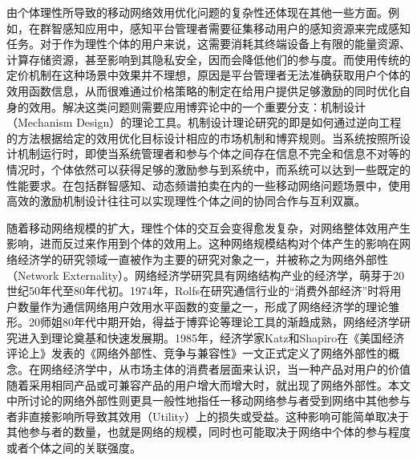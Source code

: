 由个体理性所导致的移动网络效用优化问题的复杂性还体现在其他一些方面。例如，在群智感知应用中，感知平台管理者需要征集移动用户的感知资源来完成感知任务。对于作为理性个体的用户来说，这需要消耗其终端设备上有限的能量资源、计算存储资源，甚至影响到其隐私安全，因而会降低他们的参与度。而使用传统的定价机制在这种场景中效果并不理想，原因是平台管理者无法准确获取用户个体的效用函数信息，从而很难通过价格策略的制定在给用户提供足够激励的同时优化自身的效用。解决这类问题则需要应用博弈论中的一个重要分支：机制设计（Mechanism Design）的理论工具\cite{Nisan07}。机制设计理论研究的即是如何通过逆向工程的方法根据给定的效用优化目标设计相应的市场机制和博弈规则。当系统按照所设计机制运行时，即使当系统管理者和参与个体之间存在信息不完全和信息不对等的情况时，个体依然可以获得足够的激励参与到系统中，而系统可以达到一些既定的性能要求。在包括群智感知、动态频谱拍卖在内的一些移动网络问题场景中，使用高效的激励机制设计往往可以实现理性个体之间的协同合作与互利双赢。




随着移动网络规模的扩大，理性个体的交互会变得愈发复杂，对网络整体效用产生影响，进而反过来作用到个体的效用上。这种网络规模结构对个体产生的影响在网络经济学的研究领域一直被作为主要的研究对象之一，并被称之为网络外部性（Network Externality）。网络经济学研究具有网络结构产业的经济学，萌芽于20世纪50年代至80年代初。1974年，Rolfs\cite{Rolfs}在研究通信行业的“消费外部经济”时将用户数量作为通信网络用户效用水平函数的变量之一，形成了网络经济学的理论雏形。20师姐80年代中期开始，得益于博弈论等理论工具的渐趋成熟，网络经济学研究进入到理论奠基和快速发展期。1985年，经济学家Katz和Shapiro在《美国经济评论上》发表的《网络外部性、竞争与兼容性》一文\cite{Katz}正式定义了网络外部性的概念。在网络经济学中，从市场主体的消费者层面来认识，当一种产品对用户的价值随着采用相同产品或可兼容产品的用户增大而增大时，就出现了网络外部性。本文中所讨论的网络外部性则更具一般性地指任一移动网络参与者受到网络中其他参与者非直接影响所导致其效用（Utility）上的损失或受益。这种影响可能简单取决于其他参与者的数量，也就是网络的规模，同时也可能取决于网络中个体的参与程度或者个体之间的关联强度\cite{externality}。

